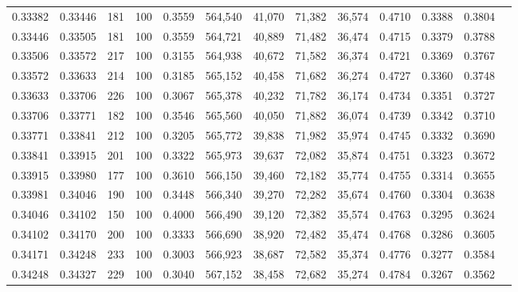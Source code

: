 \begin{tabular}{rrrrrrrrrrrrr}
0.33382 & 0.33446 &   181 & 100 &                                     0.3559 & 564,540 &  41,070 &  71,382 &  36,574 & 0.4710 & 0.3388 & 0.3804 \\
0.33446 & 0.33505 &   181 & 100 &                                     0.3559 & 564,721 &  40,889 &  71,482 &  36,474 & 0.4715 & 0.3379 & 0.3788 \\
0.33506 & 0.33572 &   217 & 100 &                                     0.3155 & 564,938 &  40,672 &  71,582 &  36,374 & 0.4721 & 0.3369 & 0.3767 \\
0.33572 & 0.33633 &   214 & 100 &                                     0.3185 & 565,152 &  40,458 &  71,682 &  36,274 & 0.4727 & 0.3360 & 0.3748 \\
0.33633 & 0.33706 &   226 & 100 &                                     0.3067 & 565,378 &  40,232 &  71,782 &  36,174 & 0.4734 & 0.3351 & 0.3727 \\
0.33706 & 0.33771 &   182 & 100 &                                     0.3546 & 565,560 &  40,050 &  71,882 &  36,074 & 0.4739 & 0.3342 & 0.3710 \\
0.33771 & 0.33841 &   212 & 100 &                                     0.3205 & 565,772 &  39,838 &  71,982 &  35,974 & 0.4745 & 0.3332 & 0.3690 \\
0.33841 & 0.33915 &   201 & 100 &                                     0.3322 & 565,973 &  39,637 &  72,082 &  35,874 & 0.4751 & 0.3323 & 0.3672 \\
0.33915 & 0.33980 &   177 & 100 &                                     0.3610 & 566,150 &  39,460 &  72,182 &  35,774 & 0.4755 & 0.3314 & 0.3655 \\
0.33981 & 0.34046 &   190 & 100 &                                     0.3448 & 566,340 &  39,270 &  72,282 &  35,674 & 0.4760 & 0.3304 & 0.3638 \\
0.34046 & 0.34102 &   150 & 100 &                                     0.4000 & 566,490 &  39,120 &  72,382 &  35,574 & 0.4763 & 0.3295 & 0.3624 \\
0.34102 & 0.34170 &   200 & 100 &                                     0.3333 & 566,690 &  38,920 &  72,482 &  35,474 & 0.4768 & 0.3286 & 0.3605 \\
0.34171 & 0.34248 &   233 & 100 &                                     0.3003 & 566,923 &  38,687 &  72,582 &  35,374 & 0.4776 & 0.3277 & 0.3584 \\
0.34248 & 0.34327 &   229 & 100 &                                     0.3040 & 567,152 &  38,458 &  72,682 &  35,274 & 0.4784 & 0.3267 & 0.3562 \\

\end{tabular}
